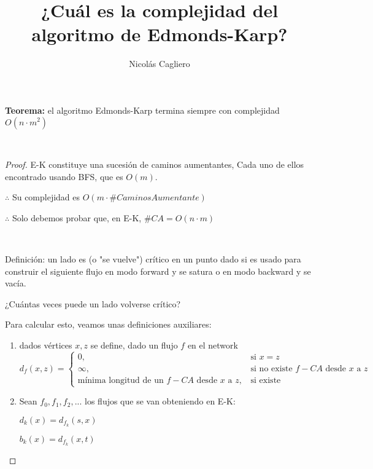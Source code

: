 \documentclass[11pt]{article}
\title{¿Cuál es la complejidad del algoritmo de Edmonds-Karp?}
\author{Nicolás Cagliero}
\begin{document}
\maketitle
\textbf{Teorema:} el algoritmo Edmonds-Karp termina siempre con complejidad $O(n \cdot m^{2}) $ \par 
\

\begin{proof}E-K constituye una sucesión de caminos aumentantes, Cada uno de ellos encontrado usando BFS, que es $O(m)$.\par

\begin{center}
	$\therefore$ Su complejidad es $O(m \cdot \#CaminosAumentante)$\par
\end{center}
\begin{center}
	$\therefore$ Solo debemos probar que, en E-K, $\#CA = O(n \cdot m)$
\end{center}
\

Definición: un lado es (o "se vuelve") crítico en un punto dado si es usado para construir el siguiente flujo en modo forward y se satura o en modo backward y se vacía.

\begin{center}
	¿Cuántas veces puede un lado volverse crítico?\par
\end{center}

Para calcular esto, veamos unas definiciones auxiliares:\par

\begin{enumerate}
\item dados vértices $x, z$ se define, dado un flujo $f$ en el network
\[   
d_f(x,z) = 
     \begin{cases}
       \text{$0,$} &\quad\text{si $x=z$}\\
       \text{$\infty,$} &\quad\text{si no existe $f-CA$ desde $x$ a $z$}\\
       \text{mínima longitud de un $f-CA$ desde $x$ a $z$,} &\quad\text{si existe}
     \end{cases}
\]

\item Sean $f_0, f_1, f_2, ...$  los flujos que se van obteniendo en E-K:
\begin{center}
	$d_k(x) = d_{f_k}(s, x)$\par
	$b_k(x) = d_{f_k}(x, t)$\par
\end{center}


\end{enumerate}
\end{proof}
\end{document}
